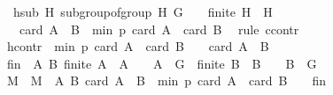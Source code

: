 \begin{isabellebody}
\ \ hsub{\isacharcolon}{\kern0pt}\ {\isachardoublequoteopen}{\isacharbraceleft}{\kern0pt}H{\isachardot}{\kern0pt}\ subgroup{\isacharunderscore}{\kern0pt}of{\isacharunderscore}{\kern0pt}group\ H\ G\ {\isacharparenleft}{\kern0pt}{\isasymcdot}{\isacharparenright}{\kern0pt}\ {\isasymone}\ {\isasymand}\ finite\ H\ {\isasymand}\ H\ {\isasymnoteq}\ {\isacharbraceleft}{\kern0pt}{\isasymone}{\isacharbraceright}{\kern0pt}{\isacharbraceright}{\kern0pt}\ {\isasymnoteq}\ {\isacharbraceleft}{\kern0pt}{\isacharbraceright}{\kern0pt}{\isachardoublequoteclose}\isanewline
\ \ \ {\isachardoublequoteopen}card\ {\isacharparenleft}{\kern0pt}A\ {\isasymcdots}\ B{\isacharparenright}{\kern0pt}\ {\isasymge}\ min\ p\ {\isacharparenleft}{\kern0pt}card\ A\ {\isacharplus}{\kern0pt}\ card\ B\ {\isacharminus}{\kern0pt}\ {}{\isacharparenright}{\kern0pt}{\isachardoublequoteclose}\isanewline
%
\isadelimproof
%
\endisadelimproof
%
\isatagproof
{}\isamarkupfalse%
{\isacharparenleft}{\kern0pt}rule\ ccontr{\isacharparenright}{\kern0pt}\isanewline
\ \ \isamarkupfalse%
\ hcontr{\isacharcolon}{\kern0pt}\ {\isachardoublequoteopen}{\isasymnot}\ min\ p\ {\isacharparenleft}{\kern0pt}card\ A\ {\isacharplus}{\kern0pt}\ card\ B\ {\isacharminus}{\kern0pt}\ {}{\isacharparenright}{\kern0pt}\ {\isasymle}\ card\ {\isacharparenleft}{\kern0pt}A\ {\isasymcdots}\ B{\isacharparenright}{\kern0pt}{\isachardoublequoteclose}\isanewline
\ \ \isamarkupfalse%
\ {\isacharquery}{\kern0pt}fin\ {\isacharequal}{\kern0pt}\ {\isachardoublequoteopen}{\isacharbraceleft}{\kern0pt}{\isacharparenleft}{\kern0pt}A{\isacharcomma}{\kern0pt}\ B{\isacharparenright}{\kern0pt}{\isachardot}{\kern0pt}\ finite\ A\ {\isasymand}\ A\ {\isasymnoteq}\ {\isacharbraceleft}{\kern0pt}{\isacharbraceright}{\kern0pt}\ {\isasymand}\ A\ {\isasymsubseteq}\ G\ {\isasymand}\ finite\ B\ {\isasymand}\ B\ {\isasymnoteq}\ {\isacharbraceleft}{\kern0pt}{\isacharbraceright}{\kern0pt}\ {\isasymand}\ B\ {\isasymsubseteq}\ G{\isacharbraceright}{\kern0pt}{\isachardoublequoteclose}\isanewline
\ \ \isamarkupfalse%
\ M\ \ {\isachardoublequoteopen}M\ {\isacharequal}{\kern0pt}\ {\isacharbraceleft}{\kern0pt}{\isacharparenleft}{\kern0pt}A{\isacharcomma}{\kern0pt}\ B{\isacharparenright}{\kern0pt}{\isachardot}{\kern0pt}\ card\ {\isacharparenleft}{\kern0pt}A\ {\isasymcdots}\ B{\isacharparenright}{\kern0pt}\ {\isacharless}{\kern0pt}\ min\ p\ {\isacharparenleft}{\kern0pt}card\ A\ {\isacharplus}{\kern0pt}\ card\ B\ {\isacharminus}{\kern0pt}\ {}{\isacharparenright}{\kern0pt}{\isacharbraceright}{\kern0pt}\ {\isasyminter}\ {\isacharquery}{\kern0pt}fin{\isachardoublequoteclose}\isanewline

\end{isabellebody}
